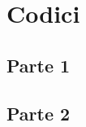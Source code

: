 \documentclass[preprint,12pt]{elsarticle}
\begin{document}
\newpage

\section{Codici}

\subsection{Parte 1}



\newpage 
\subsection{Parte 2}


\end{document}
